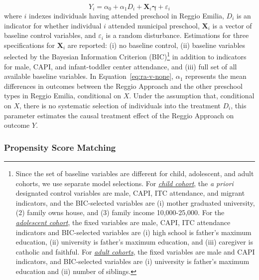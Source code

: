 \begin{equation}
	Y_i = \alpha_0 + \alpha_1 D_i + \bm{X}_i \bm{\gamma} + \varepsilon_i
	\label{eq:ra-v-none}
\end{equation}
where $i$ indexes individuals having attended preschool in Reggio Emilia, $D_i$ is an indicator for whether individual $i$ attended municipal preschool, $\bm{X}_i$ is a vector of baseline control variables, and $\varepsilon_i$ is a random disturbance. Estimations for three specifications for $\bm{X}_i$ are reported: (i) no baseline control, (ii) baseline variables selected by the Bayesian Information Criterion (BIC)\footnote{Since the set of baseline variables are different for child, adolescent, and adult cohorts, we use separate model selections. For \emph{\underline{child cohort}}, the \emph{a priori} designated control variables are male, CAPI, ITC attendance, and migrant indicators, and the BIC-selected variables are (i) mother graduated university, (2) family owns house, and (3) family income 10,000-25,000. For the \emph{\underline{adolescent cohort}}, the fixed variables are male, CAPI, ITC attendance indicators and BIC-selected variables are (i) high school is father's maximum education, (ii) university is father's maximum education, and (iii) caregiver is catholic and faithful. For \emph{\underline{adult cohorts}}, the fixed variables are male and CAPI indicators, and BIC-selected variables are (i) university is father's maximum education and (ii) number of siblings.} in addition to indicators for male, CAPI, and infant-toddler center attendance, and (iii) full set of all available baseline variables. In Equation~\ref{eq:ra-v-none}, $\alpha_1$ represents the mean differences in outcomes between the Reggio Approach and the other preschool types in Reggio Emilia, conditional on $X$. Under the assumption that, conditional on $X$, there is no systematic selection of individuals into the treatment $D_i$, this parameter estimates the causal treatment effect of the Reggio Approach on outcome $Y$.

\subsubsection{Propensity Score Matching}  \label{subsubsection:psm}

